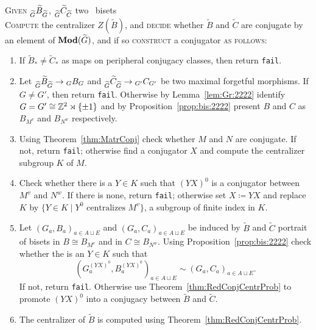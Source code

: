 \documentclass{amsart}
\begin{document}
\begin{algo}\label{algo:torbisets}
  \textsc{Given} $\subscript{\widetilde G}{\widetilde B}_{\widetilde G}$, $\subscript{\widetilde G}{\widetilde C}_{\widetilde C}$ two \Tor\ bisets\\
  \textsc{Compute} the centralizer $Z(\widetilde B)$, and \textsc{decide} whether $\widetilde B$ and $\widetilde C$ are conjugate by an element of $\mathbf{\relax Mod}(\widetilde G)$, and if so \textsc{construct} a conjugator \textsc{as follows:}\\\upshape
  \begin{enumerate}
  \item If $\widetilde B_*\neq \widetilde C_*$ as maps on peripheral
    conjugacy classes, then return \texttt{fail}.
  \item Let $\subscript{\widetilde G}{\widetilde B}_{\widetilde G}\to
    \subscript G B_G$ and $\subscript{\widetilde G}{\widetilde C}_{\widetilde G}\to
    \subscript{G'}C_{G'}$ be two maximal forgetful morphisms. If $G\neq G'$,
    then return \texttt{fail}. Otherwise by Lemma~\ref{lem:Gr:2222} identify
    $G=G'\cong {\mathbb Z}^2\rtimes\{\pm1\}$ and by
    Proposition~\ref{prop:bis:2222} present $B$ and $C$ as $B_{M^v}$
    and $B_{N^w}$ respectively.
  \item Using Theorem~\ref{thm:MatrConj} check whether $M$ and $N$ are
    conjugate. If not, return \texttt{fail}; otherwise find a conjugator $X$
    and compute the centralizer subgroup $K$ of $M$.
  \item Check whether there is a $Y\in K$ such that $(Y X)^0$ is a
    conjugator between $M^v$ and $N^w$. If there is none, return
    \texttt{fail}; otherwise set $X\coloneqq Y X$ and replace $K$ by
    $\{Y\in K\mid Y^0\text{ centralizes }M^v\}$, a subgroup of finite
    index in $K$.
  \item Let $(G_a,B_a)_{a\in A\sqcup E}$ and $(G_a,C_a)_{a\in A\sqcup
      E}$ be induced by $\widetilde B$ and $\widetilde C$ portrait of
    bisets in $B\cong B_{M^v}$ and in $C\cong B_{N^w}$. Using
    Proposition~\ref{prop:bis:2222} check whether the is an $Y\in K$
    such that
    \[\left(G^{(Y X)^0}_a,B^{(Y X)^0}_a\right)_{a\in A\sqcup E}\sim (G_a,C_a)_{a\in A\sqcup E}.\] 
    If not, return \texttt{fail}. Otherwise use
    Theorem~\ref{thm:RedConjCentrProb} to promote $(Y X)^0$ into a
    conjugacy between $\widetilde B$ and $\widetilde C$.
  \item The centralizer of $\widetilde B$ is computed using
    Theorem~\ref{thm:RedConjCentrProb}.
  \end{enumerate}
\end{algo}
\end{document}
